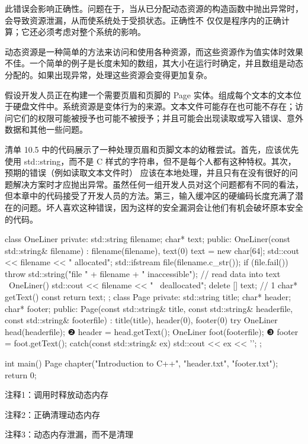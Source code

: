 此错误会影响正确性。问题在于，当从已分配动态资源的构造函数中抛出异常时，会导致资源泄漏，从而使系统处于受损状态。正确性不 仅仅是程序内的正确计算；它还必须考虑对整个系统的影响。

动态资源是一种简单的方法来访问和使用各种资源，而这些资源作为值实体时效果不佳。一个简单的例子是长度未知的数组，其大小在运行时确定，并且数组是动态分配的。如果出现异常，处理这些资源会变得更加复杂。


假设开发人员正在构建一个需要页眉和页脚的 Page 实体。组成每个文本的文本位于硬盘文件中。系统资源是变体行为的来源。文本文件可能存在也可能不存在；访问它们的权限可能被授予也可能不被授予；并且可能会出现读取或写入错误、意外数据和其他一些问题。

清单 10.5 中的代码展示了一种处理页眉和页脚文本的幼稚尝试。首先，应该优先使用 std::string，而不是 C 样式的字符串，但不是每个人都有这种特权。其次，预期的错误（例如读取文本文件时） 应该在本地处理，并且只有在没有很好的问题解决方案时才应抛出异常。虽然任何一组开发人员对这个问题都有不同的看法，但本章中的代码接受了开发人员的方法。第三，输入缓冲区的硬编码长度充满了潜在的问题。坏人喜欢这种错误，因为这样的安全漏洞会让他们有机会破坏原本安全的代码。


\begin{cpp}
class OneLiner {
private:
  std::string filename;
  char* text;
public:
  OneLiner(const std::string& filename) : filename(filename), text(0) {
    text = new char[64];
    std::cout << filename << " allocated\n";
    std::ifstream file(filename.c_str());
    if (file.fail())
      throw std::string("file " + filename + " inaccessible");
    // read data into text
  }
  ~OneLiner() { std::cout << filename <<
    " ~deallocated\n"; delete [] text; } // 1
    char* getText() const { return text; }
};
class Page {
private:
  std::string title;
  char* header;
  char* footer;
public:
  Page(const std::string& title, const std::string& headerfile, const
  std::string& footerfile) :
  title(title), header(0), footer(0) {
    try {
      OneLiner head(headerfile); ❷
      header = head.getText();
      OneLiner foot(footerfile); ❸
      footer = foot.getText();
    } catch(const std::string& ex) {
      std::cout << ex << '\n';
    }
  }
};

int main() {
  Page chapter("Introduction to C++", "header.txt", "footer.txt");
  return 0;
}
\end{cpp}

{\footnotesize
注释1：调用时释放动态内存

注释2：正确清理动态内存

注释3：动态内存泄漏，而不是清理
}

